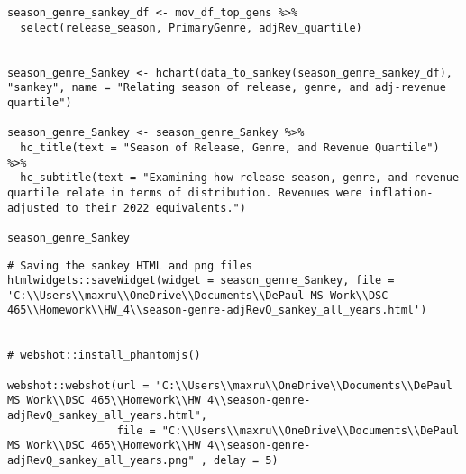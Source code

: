 \begin{lstlisting}
season_genre_sankey_df <- mov_df_top_gens %>%
  select(release_season, PrimaryGenre, adjRev_quartile)


season_genre_Sankey <- hchart(data_to_sankey(season_genre_sankey_df), "sankey", name = "Relating season of release, genre, and adj-revenue quartile")

season_genre_Sankey <- season_genre_Sankey %>%
  hc_title(text = "Season of Release, Genre, and Revenue Quartile") %>%
  hc_subtitle(text = "Examining how release season, genre, and revenue quartile relate in terms of distribution. Revenues were inflation-adjusted to their 2022 equivalents.")

season_genre_Sankey
\end{lstlisting}

\begin{lstlisting}
# Saving the sankey HTML and png files
htmlwidgets::saveWidget(widget = season_genre_Sankey, file = 'C:\\Users\\maxru\\OneDrive\\Documents\\DePaul MS Work\\DSC 465\\Homework\\HW_4\\season-genre-adjRevQ_sankey_all_years.html')


# webshot::install_phantomjs()

webshot::webshot(url = "C:\\Users\\maxru\\OneDrive\\Documents\\DePaul MS Work\\DSC 465\\Homework\\HW_4\\season-genre-adjRevQ_sankey_all_years.html",
                 file = "C:\\Users\\maxru\\OneDrive\\Documents\\DePaul MS Work\\DSC 465\\Homework\\HW_4\\season-genre-adjRevQ_sankey_all_years.png" , delay = 5)
\end{lstlisting}

